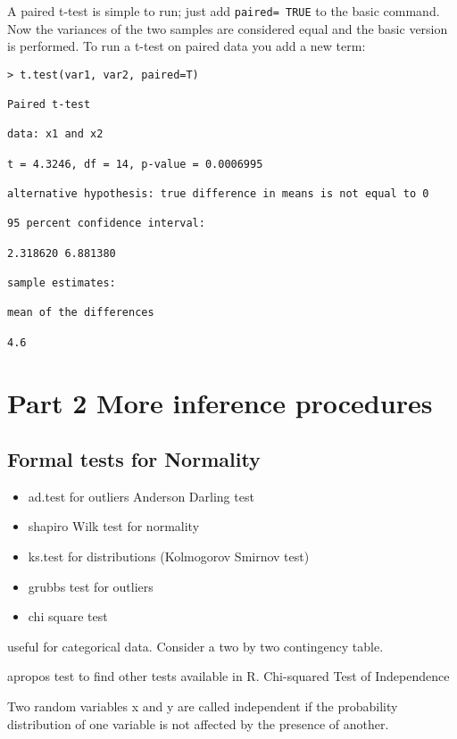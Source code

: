 A paired t-test is simple to run; just add \texttt{paired= TRUE} to the basic command. Now the variances of the two samples are considered equal and the basic version is performed. To run a t-test on paired data you add a new term:

\begin{framed}
\begin{verbatim}
> t.test(var1, var2, paired=T)

Paired t-test

data: x1 and x2

t = 4.3246, df = 14, p-value = 0.0006995

alternative hypothesis: true difference in means is not equal to 0

95 percent confidence interval:

2.318620 6.881380

sample estimates:

mean of the differences

4.6

\end{verbatim}
\end{framed}


\section{Part 2 More inference procedures}
\subsection{Formal tests for Normality}

\begin{itemize}
\item ad.test for outliers Anderson Darling test
\item shapiro Wilk test for normality
\item ks.test for distributions (Kolmogorov Smirnov test)
\item grubbs test for outliers
\item chi square test
\end{itemize}

useful for categorical data. Consider a two by two contingency table.


apropos test to find other tests available in R. Chi-squared Test of Independence

Two random variables x and y are called independent if the probability distribution of one variable is not affected by the presence of another.

